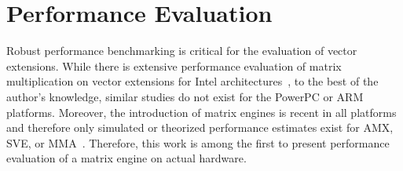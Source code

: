 \documentclass[\main/thesis.tex]{subfiles}
\begin{document}
\section{Performance Evaluation}
Robust performance benchmarking is critical for the evaluation of vector extensions.
While there is extensive performance evaluation of matrix multiplication on vector extensions for Intel architectures~\autocite{hassan20161performance,hemeida2020optimizing,alappat2020understanding}, to the best of the author's knowledge, similar studies do not exist for the PowerPC or ARM platforms.
Moreover, the introduction of matrix engines is recent in all platforms and therefore only simulated or theorized performance estimates exist for AMX, SVE, or MMA~\autocite{poenaru2020evaluating,domke2020matrix}.
Therefore, this work is among the first to present performance evaluation of a matrix engine on actual hardware.
\end{document}
